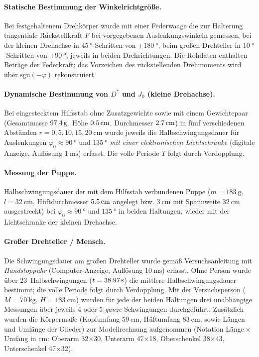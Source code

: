 \documentclass[11pt,a4paper]{article}
\begin{document}
\paragraph{Statische Bestimmung der Winkelrichtgröße.}
Bei festgehaltenem Drehkörper wurde mit einer Federwaage die
zur Halterung tangentiale Rückstellkraft $F$ bei vorgegebenen
Auslenkungswinkeln gemessen, bei der kleinen Drehachse in
$\SI{45}{\degree}$-Schritten von $\pm\SI{180}{\degree}$, beim
großen Drehteller in $\SI{10}{\degree}$-Schritten von
$\pm\SI{90}{\degree}$, jeweils in beiden Drehrichtungen. Die
Rohdaten enthalten Beträge der Federkraft; das Vorzeichen
des rückstellenden Drehmoments wird über $\mathrm{sgn}(-\varphi)$
rekonstruiert.

\paragraph{Dynamische Bestimmung von $D^{*}$ und $J_{0}$ (kleine Drehachse).}
Bei eingestecktem Hilfsstab ohne Zusatzgewichte sowie mit einem
Gewichtepaar (Gesamtmasse $\SI{97{,}4}{\gram}$, Höhe
$\SI{0{,}5}{\centi\metre}$, Durchmesser $\SI{2{,}7}{\centi\metre}$) in
fünf verschiedenen Abständen $r=0,5,10,15,\SI{20}{\centi\metre}$
wurde jeweils die Halbschwingungsdauer für Auslenkungen
$\varphi_{0}\approx\SI{90}{\degree}$ und $\SI{135}{\degree}$
\emph{mit einer elektronischen Lichtschranke}
(digitale Anzeige, Auflösung $\SI{1}{\milli\second}$) erfasst. Die
volle Periode $T$ folgt durch Verdopplung.

\paragraph{Messung der Puppe.}
Halbschwingungsdauer der mit dem Hilfsstab verbundenen Puppe
($m = \SI{183}{\gram}$, $l=\SI{32}{\centi\metre}$, Hüftdurchmesser
$\SI{5{,}5}{\centi\metre}$ angelegt bzw. $\SI{3}{\centi\metre}$ mit
Spannweite $\SI{32}{\centi\metre}$ ausgestreckt) bei
$\varphi_{0}\approx\SI{90}{\degree}$ und $\SI{135}{\degree}$ in
beiden Haltungen, wieder mit der Lichtschranke der kleinen
Drehachse.

\paragraph{Großer Drehteller / Mensch.}
Die Schwingungsdauer am großen Drehteller wurde gemäß
Versuchsanleitung mit \emph{Hand\-stopp\-uhr} (Computer-Anzeige,
Auflösung $\SI{10}{\milli\second}$) erfasst.
Ohne Person wurde über 23~Halbschwingungen ($t = \SI{38{,}97}{\second}$)
die mittlere Halbschwingungsdauer bestimmt; die volle Periode
folgt durch Verdopplung. Mit der Versuchsperson
($M=\SI{70}{\kilogram}$, $H=\SI{183}{\centi\metre}$) wurden
für jede der beiden Haltungen drei unabhängige Messungen über
jeweils 4 oder 5 \emph{ganze} Schwingungen durchgeführt. Zusätzlich wurden die Körpermaße (Kopfumfang
$\SI{59}{\centi\metre}$, Hüftumfang $\SI{83}{\centi\metre}$, sowie
Längen und Umfänge der Glieder) zur Modellrechnung aufgenommen
(Notation Länge\,$\times$\,Umfang in cm: Oberarm 32$\times$30,
Unterarm 47$\times$18, Oberschenkel 38$\times$43, Unterschenkel
47$\times$32).
\end{document}
